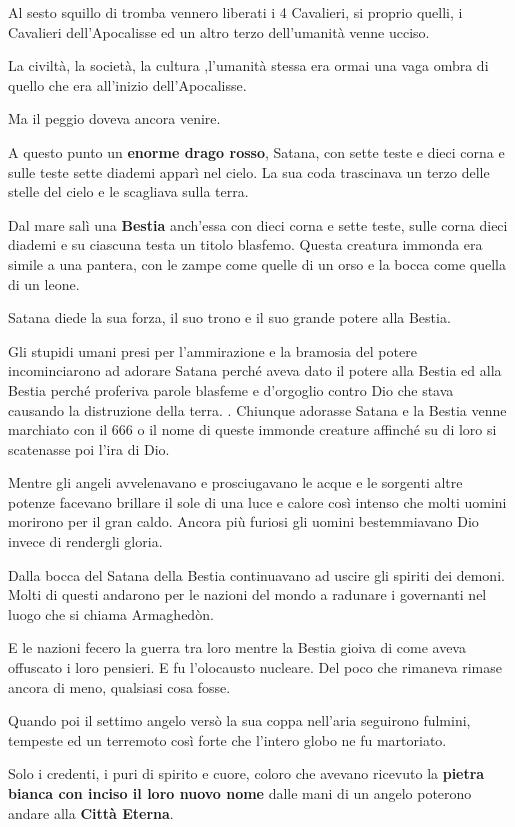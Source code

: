 \documentclass[12pt,a4paper,twoside,openany]{book}
\begin{document}
\begin{multicols}{2}
Al sesto squillo di tromba vennero liberati i 4 Cavalieri, si proprio quelli, i Cavalieri dell'Apocalisse ed un altro terzo dell'umanità venne ucciso.

La civiltà, la società, la cultura ,l'umanità stessa era ormai una vaga ombra di quello che era all'inizio dell'Apocalisse.

Ma il peggio doveva ancora venire.

A questo punto un \textbf{enorme drago rosso}, Satana, con sette teste e dieci corna e sulle teste sette diademi apparì nel cielo. La sua coda trascinava un terzo delle stelle del cielo e le scagliava sulla terra. 

Dal mare salì una \textbf{Bestia} anch'essa con dieci corna e sette teste, sulle corna dieci diademi e su ciascuna testa un titolo blasfemo. Questa creatura immonda era simile a una pantera, con le zampe come quelle di un orso e la bocca come quella di un leone. 

Satana diede la sua forza, il suo trono e il suo grande potere alla Bestia. 

Gli stupidi umani presi per l'ammirazione e la bramosia del potere incominciarono ad adorare Satana perché aveva dato il potere alla Bestia ed alla Bestia perché proferiva parole blasfeme e d'orgoglio contro Dio che stava causando la distruzione della terra.
.
Chiunque adorasse Satana e la Bestia venne marchiato con il 666 o il nome di queste immonde creature affinché su di loro si scatenasse poi l'ira di Dio.

Mentre gli angeli avvelenavano e prosciugavano le acque e le sorgenti altre potenze facevano brillare il sole di una luce e calore così intenso che molti uomini morirono per il gran caldo. Ancora più furiosi gli uomini bestemmiavano Dio invece di rendergli gloria.

Dalla bocca del Satana della Bestia continuavano ad uscire gli spiriti dei demoni. Molti di questi andarono per le nazioni del mondo a radunare i governanti nel luogo che si chiama Armaghedòn.

E le nazioni fecero la guerra tra loro mentre la Bestia gioiva di come aveva offuscato i loro pensieri. E fu l'olocausto nucleare. Del poco che rimaneva rimase ancora di meno, qualsiasi cosa fosse.

Quando poi il settimo angelo versò la sua coppa nell’aria seguirono fulmini, tempeste ed un terremoto così forte che l'intero globo ne fu martoriato.

Solo i credenti, i puri di spirito e cuore, coloro che avevano ricevuto la \textbf{pietra bianca con inciso il loro nuovo nome} dalle mani di un angelo poterono andare alla \textbf{Città Eterna}.


\end{multicols}
\end{document}
